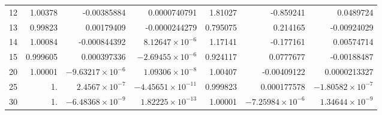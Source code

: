 \documentclass[aps,nofootinbib,showkeys,noshowpacs,preprintnumbers,amsmath,amssymb]{revtex4}
\begin{document}
\begin{table}
\begin{ruledtabular}
\begin{tabular}{r|rrr|rrr}
12      & 1.00378 & -0.00385884 & 0.0000740791 & 1.81027 & -0.859241 & 0.0489724 \\
13      & 0.99823 & 0.00179409 & -0.0000244279 & 0.795075 & 0.214165 & -0.00924029 \\
14      & 1.00084 & -0.000844392 & $8.12647 \times 10^{-6}$  & 1.17141 & -0.177161 & 0.00574714 \\
15      & 0.999605 & 0.000397336 & $-2.69455 \times 10^{-6}$ & 0.924117 & 0.0777677 & -0.00188487 \\
\hline
20      & 1.00001 & $-9.63217 \times 10^{-6}$ & $1.09306 \times 10^{-8}$  & 1.00407 & -0.00409122 & 0.0000213327 \\
\hline
25      & 1. & $2.4567 \times 10^{-7}$ & $-4.45651 \times 10^{-11}$  & 0.999823 & 0.000177578 & $-1.80582 \times 10^{-7}$ \\ 
\hline
30      & 1. & $-6.48368 \times 10^{-9}$ & $1.82225 \times 10^{-13}$ & 1.00001 & $-7.25984 \times 10^{-6}$ & $1.34644 \times 10^{-9}$
\end{tabular}
\end{ruledtabular}
\end{table}
\end{document}
